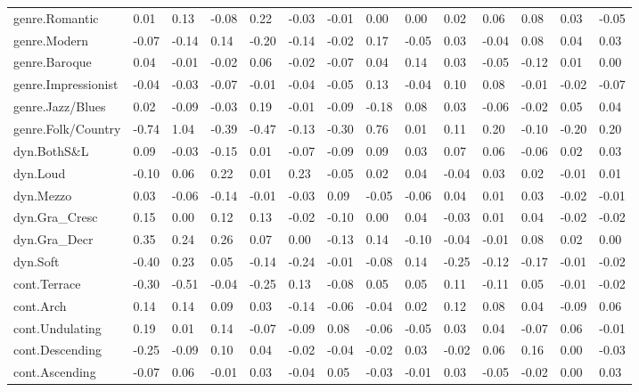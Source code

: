 \documentclass[
]{article}
\newenvironment{lltable}{\begin{landscape}\begin{center}\begin{ThreePartTable}}{\end{ThreePartTable}\end{center}\end{landscape}}
\begin{document}
\begin{lltable}
{\begin{longtable}{llllllllllllll}
genre.Romantic & 0.01 & 0.13 & -0.08 & 0.22 & -0.03 & -0.01 & 0.00 & 0.00 & 0.02 & 0.06 & 0.08 & 0.03 & -0.05\\
genre.Modern & -0.07 & -0.14 & 0.14 & -0.20 & -0.14 & -0.02 & 0.17 & -0.05 & 0.03 & -0.04 & 0.08 & 0.04 & 0.03\\
genre.Baroque & 0.04 & -0.01 & -0.02 & 0.06 & -0.02 & -0.07 & 0.04 & 0.14 & 0.03 & -0.05 & -0.12 & 0.01 & 0.00\\
genre.Impressionist & -0.04 & -0.03 & -0.07 & -0.01 & -0.04 & -0.05 & 0.13 & -0.04 & 0.10 & 0.08 & -0.01 & -0.02 & -0.07\\
genre.Jazz/Blues & 0.02 & -0.09 & -0.03 & 0.19 & -0.01 & -0.09 & -0.18 & 0.08 & 0.03 & -0.06 & -0.02 & 0.05 & 0.04\\
genre.Folk/Country & -0.74 & 1.04 & -0.39 & -0.47 & -0.13 & -0.30 & 0.76 & 0.01 & 0.11 & 0.20 & -0.10 & -0.20 & 0.20\\
dyn.BothS\&L & 0.09 & -0.03 & -0.15 & 0.01 & -0.07 & -0.09 & 0.09 & 0.03 & 0.07 & 0.06 & -0.06 & 0.02 & 0.03\\
dyn.Loud & -0.10 & 0.06 & 0.22 & 0.01 & 0.23 & -0.05 & 0.02 & 0.04 & -0.04 & 0.03 & 0.02 & -0.01 & 0.01\\
dyn.Mezzo & 0.03 & -0.06 & -0.14 & -0.01 & -0.03 & 0.09 & -0.05 & -0.06 & 0.04 & 0.01 & 0.03 & -0.02 & -0.01\\
dyn.Gra\_Cresc & 0.15 & 0.00 & 0.12 & 0.13 & -0.02 & -0.10 & 0.00 & 0.04 & -0.03 & 0.01 & 0.04 & -0.02 & -0.02\\
dyn.Gra\_Decr & 0.35 & 0.24 & 0.26 & 0.07 & 0.00 & -0.13 & 0.14 & -0.10 & -0.04 & -0.01 & 0.08 & 0.02 & 0.00\\
dyn.Soft & -0.40 & 0.23 & 0.05 & -0.14 & -0.24 & -0.01 & -0.08 & 0.14 & -0.25 & -0.12 & -0.17 & -0.01 & -0.02\\
cont.Terrace & -0.30 & -0.51 & -0.04 & -0.25 & 0.13 & -0.08 & 0.05 & 0.05 & 0.11 & -0.11 & 0.05 & -0.01 & -0.02\\
cont.Arch & 0.14 & 0.14 & 0.09 & 0.03 & -0.14 & -0.06 & -0.04 & 0.02 & 0.12 & 0.08 & 0.04 & -0.09 & 0.06\\
cont.Undulating & 0.19 & 0.01 & 0.14 & -0.07 & -0.09 & 0.08 & -0.06 & -0.05 & 0.03 & 0.04 & -0.07 & 0.06 & -0.01\\
cont.Descending & -0.25 & -0.09 & 0.10 & 0.04 & -0.02 & -0.04 & -0.02 & 0.03 & -0.02 & 0.06 & 0.16 & 0.00 & -0.03\\
cont.Ascending & -0.07 & 0.06 & -0.01 & 0.03 & -0.04 & 0.05 & -0.03 & -0.01 & 0.03 & -0.05 & -0.02 & 0.00 & 0.03\\

\end{longtable}}
\end{lltable}
\end{document}

